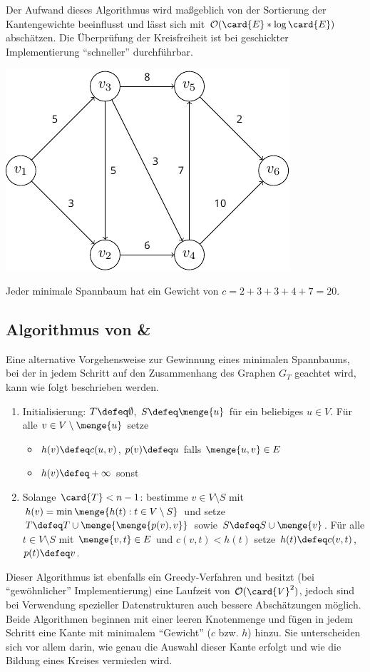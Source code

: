 Der Aufwand dieses Algorithmus wird maßgeblich von der Sortierung der Kantengewichte beeinflusst und lässt sich mit $\mathcal{O}(\card{E} * \log\card{E})$ abschätzen. Die Überprüfung der Kreisfreiheit ist bei geschickter Implementierung \enquote{schneller} durchführbar.

\begin{beispiel}
	\includegraphics[width=.3\textwidth]{optinum_abb/optinum_5_2_bsp5-1.pdf}
	
	Jeder minimale Spannbaum hat ein Gewicht von $c = 2+3+3+4+7 = 20$.
\end{beispiel}

\subsection{Algorithmus von  \& }

Eine alternative Vorgehensweise zur Gewinnung eines minimalen Spannbaums, bei der in jedem Schritt auf den Zusammenhang des Graphen $G_T$ geachtet wird, kann wie folgt beschrieben werden.

\begin{enumerate}[label=Schritt \arabic*:, leftmargin=*, start=0]
	\item Initialisierung: $T \defeq \emptyset$, $S \defeq \menge{u}$ für ein beliebiges $u \in V$. Für alle $v \in V \setminus \menge{u}$ setze
	\begin{itemize}[nolistsep, topsep=-\parskip]
		\item $h(v) \defeq c(u,v)$, $p(v) \defeq u$ \hspace{1em} falls $\menge{u,v} \in E$
		\item $h(v) \defeq + \infty$ \hspace{1em} sonst
	\end{itemize}
	\item Solange $\card{T} < n -1$: bestimme $v \in V \setminus S$ mit $h(v) = \min\menge{h(t) : t \in V \setminus S}$ und setze $T \defeq T \cup \menge{\menge{p(v),v}}$ sowie $S \defeq S \cup \menge{v}$. Für alle $t \in V \setminus S$ mit $\menge{v,t} \in E$ und $c(v,t) < h(t)$ setze $h(t) \defeq c(v,t)$, $p(t) \defeq v$.
\end{enumerate}

Dieser Algorithmus ist ebenfalls ein Greedy-Verfahren und besitzt (bei \enquote{gewöhnlicher} Implementierung) eine Laufzeit von $\mathcal{O}(\card{V}^2)$, jedoch sind bei Verwendung spezieller Datenstrukturen auch bessere Abschätzungen möglich. Beide Algorithmen beginnen mit einer leeren Knotenmenge und fügen in jedem Schritt eine Kante mit minimalem \enquote{Gewicht} ($c$ bzw. $h$) hinzu. Sie unterscheiden sich vor allem darin, wie genau die Auswahl dieser Kante erfolgt und wie die Bildung eines Kreises vermieden wird.
